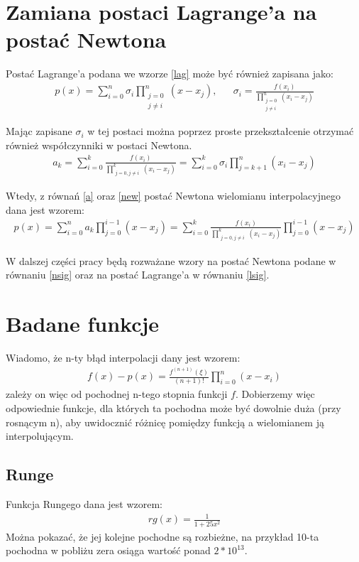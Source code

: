 \documentclass[paper=a4, fontsize=11pt]{scrartcl} %
\numberwithin{equation}{section} %
\numberwithin{figure}{section} %
\numberwithin{table}{section} %
\begin{document}
\section{Zamiana postaci Lagrange'a na postać Newtona}
Postać Lagrange'a podana we wzorze \ref{lag} może być również zapisana jako:
\begin{align} 
 p(x)= \sum_{i=0}^{n} \sigma_i \prod_{\substack{j=0 \\ j \neq i}}^n (x-x_j), &&	\label{lsig}
 \sigma_i = \frac{f(x_i)}{\prod_{\substack{j=0 \\ j \neq i}}^n (x_i-x_j)}
\end{align}

Mając zapisane $\sigma_i$ w tej postaci można poprzez proste przekształcenie otrzymać
również współczynniki w postaci Newtona.
\begin{align} 
 a_k = \sum_{i=0}^k \frac{f(x_i)} {\prod_{\substack{j=0, j \neq i}}^k (x_i - x_j)} \label{a}
 = \sum_{i=0}^k \sigma_i \prod_{j=k+1}^n (x_i-x_j)
\end{align}

Wtedy, z równań \ref{a} oraz \ref{new} postać Newtona wielomianu interpolacyjnego
dana jest wzorem:
\begin{align} 
 p(x)= \sum_{i=0}^{n} a_k \prod_{j=0}^{i-1} (x-x_j) \label{nsig}
 = \sum_{i=0}^k \frac{f(x_i)} {\prod_{\substack{j=0, j \neq i}}^k (x_i - x_j)} \prod_{j=0}^{i-1} (x-x_j)
\end{align}

W dalszej części pracy będą rozważane wzory na postać Newtona podane w równaniu
\ref{nsig} oraz na postać Lagrange'a w równaniu \ref{lsig}.

\section{Badane funkcje}

Wiadomo, że n-ty błąd interpolacji dany jest wzorem:
\begin{align} 
 f(x) - p(x) = \frac{f^{(n+1)}(\xi)}{(n+1)!} \prod_{i=0}^n (x-x_i)
\end{align}
zależy on więc od pochodnej n-tego stopnia funkcji $f$. 
Dobierzemy więc odpowiednie funkcje, dla których ta pochodna może być dowolnie duża
(przy rosnącym n), aby uwidocznić różnicę pomiędzy funkcją a wielomianem ją interpolującym.

\subsection{Runge}
Funkcja Rungego dana jest wzorem:
\begin{align}
 rg(x) = \frac{1}{1+25x^2} 
\end{align}
Można pokazać, że jej kolejne pochodne są rozbieżne, na przykład 10-ta pochodna
w pobliżu zera osiąga wartość ponad $2*10^13$.
\end{document}
